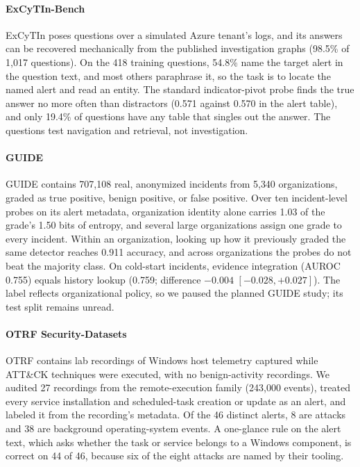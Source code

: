 \paragraph{ExCyTIn-Bench~\citep{excytin}} ExCyTIn poses questions over a simulated Azure tenant's logs, and its answers can be recovered mechanically from the published investigation graphs (98.5\% of 1{,}017 questions). On the 418 training questions, 54.8\% name the target alert in the question text, and most others paraphrase it, so the task is to locate the named alert and read an entity. The standard indicator-pivot probe finds the true answer no more often than distractors (0.571 against 0.570 in the alert table), and only 19.4\% of questions have any table that singles out the answer. The questions test navigation and retrieval, not investigation.

\paragraph{GUIDE~\citep{guide}} GUIDE contains 707{,}108 real, anonymized incidents from 5{,}340 organizations, graded as true positive, benign positive, or false positive. Over ten incident-level probes on its alert metadata, organization identity alone carries 1.03 of the grade's 1.50 bits of entropy, and several large organizations assign one grade to every incident. Within an organization, looking up how it previously graded the same detector reaches 0.911 accuracy, and across organizations the probes do not beat the majority class. On cold-start incidents, evidence integration (AUROC 0.755) equals history lookup (0.759; difference $-0.004$ $[-0.028,+0.027]$). The label reflects organizational policy, so we paused the planned GUIDE study; its test split remains unread.

\paragraph{OTRF Security-Datasets~\citep{otrf}} OTRF contains lab recordings of Windows host telemetry captured while ATT\&CK techniques were executed, with no benign-activity recordings. We audited 27 recordings from the remote-execution family (243{,}000 events), treated every service installation and scheduled-task creation or update as an alert, and labeled it from the recording's metadata. Of the 46 distinct alerts, 8 are attacks and 38 are background operating-system events. A one-glance rule on the alert text, which asks whether the task or service belongs to a Windows component, is correct on 44 of 46, because six of the eight attacks are named by their tooling.

